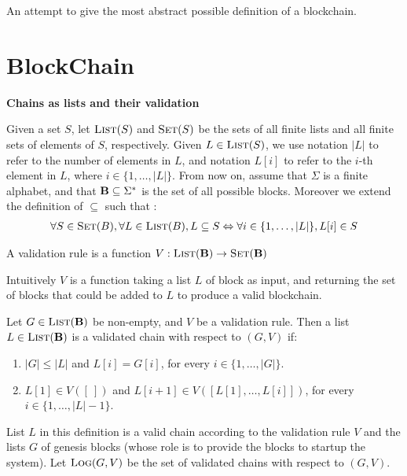 
An attempt to give the most abstract possible definition of a blockchain.

\section{BlockChain}
\medskip
\noindent
\textbf{Chains as lists and their validation}

Given a set $S$, let $\text{\sc List}(S)$ and $\text{\sc Set}(S)$ be the sets of all finite lists and all finite sets of elements of $S$, respectively. Given $L \in \text{\sc List}(S)$, we use notation $|L|$ to refer to the number of elements in $L$, and notation $L[i]$ to refer to the $i$-th element in $L$, where $i \in \{1, \ldots, |L|\}$. From now on, assume that $\Sigma$ is a finite alphabet, and that $\text{\bf B} \subseteq \Sigma^*$ is the set of all possible blocks.  Moreover we extend the definition of $\subseteq$ such that :
\begin{eqnarray*}
	\forall S \in \text{\sc Set}(B), \forall L \in \text{\sc List}(B), L \subseteq S \Leftrightarrow \forall i \in \{1, \ldots, |L|\}, L[i] \in S
\end{eqnarray*}

\begin{mydef}
A validation rule is a function $V : \text{\sc List}(\text{\bf B}) \to \text{\sc Set}(\text{\bf B})$
\end{mydef}
Intuitively $V$ is a function taking a list $L$ of block as input, and returning the set of blocks that could be added to $L$ to produce a valid blockchain.

\begin{mydef}
Let $G \in \text{\sc List}(\text{\bf B})$ be non-empty, and $V$ be a validation rule. Then a list $L \in \text{\sc List}(\text{\bf B})$ is a validated chain with respect to $(G,V)$ if:
\begin{enumerate}
\item $|G| \leq |L|$ and $L[i] = G[i]$, for every $i \in \{1, \ldots, |G|\}$.

\item $L[1] \in V([\ ])$ and $L[i+1] \in V([L[1], \ldots, L[i]])$, for every $i \in \{1, \ldots, |L|-1\}$.
\end{enumerate}
\end{mydef}
List $L$ in this definition is a valid chain according to the validation rule $V$ and the lists $G$ of genesis blocks (whose role is to provide the blocks to startup the system). Let $\text{\sc Log}(G,V)$ be the set of validated chains with respect to $(G,V)$.

